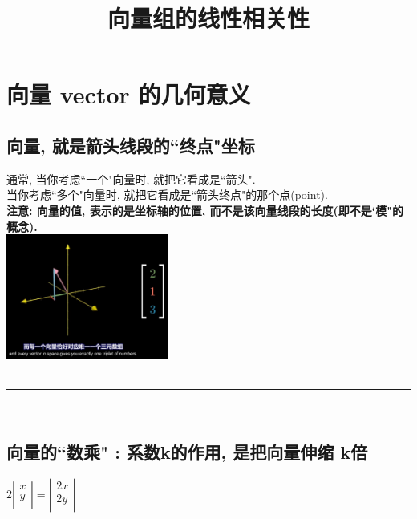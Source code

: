 \documentclass[UTF8]{ctexart}
\title{向量组的线性相关性}
\begin{document}
\tableofcontents %
\date{} %
\maketitle  %

\section{向量 vector 的几何意义}

\subsection{向量, 就是箭头线段的``终点"坐标}

通常, 当你考虑``一个"向量时, 就把它看成是``箭头". \\
当你考虑``多个"向量时, 就把它看成是``箭头终点"的那个点(point).\\

\textbf{注意: 向量的值, 表示的是坐标轴的位置, 而不是该向量线段的长度(即不是`模"的概念).}\\

\includegraphics[width=0.4\textwidth]{img/0066.png}\\



~\\
\hrule
~\\

\subsection{向量的``数乘" : 系数k的作用, 是把向量伸缩 k倍}

$2\left| \begin{array}{l}
		x \\
		y \\
	\end{array} \right|=\left| \begin{array}{l}
		2x \\
		2y \\
	\end{array} \right|
$\\
\end{document}

